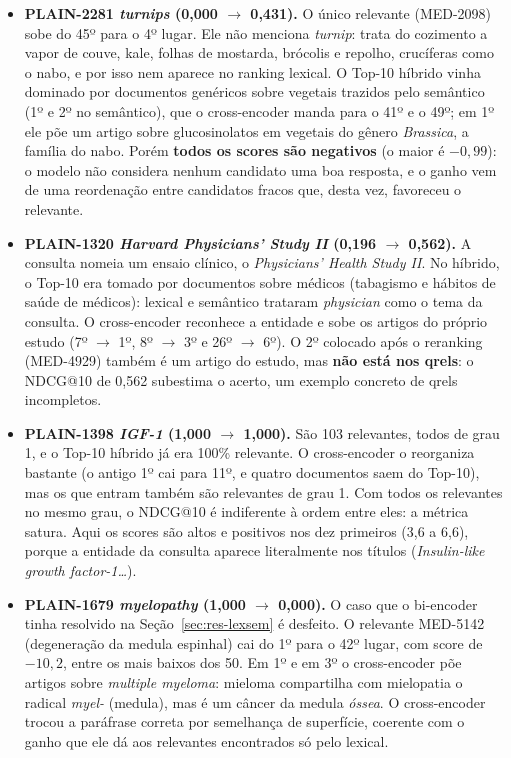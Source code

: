 \documentclass[10pt,a4paper]{article}
\newcommand{\med}[1]{\mbox{MED-#1}}         %
\newcommand{\pq}[1]{\mbox{PLAIN-#1}}        %
\begin{document}
\begin{itemize}
\item \textbf{\pq{2281} \emph{turnips} (0,000 $\to$ 0,431).} O único relevante (\med{2098}) sobe do 45º para o 4º lugar. Ele não menciona \emph{turnip}: trata do cozimento a vapor de couve, kale, folhas de mostarda, brócolis e repolho, crucíferas como o nabo, e por isso nem aparece no ranking lexical. O Top-10 híbrido vinha dominado por documentos genéricos sobre vegetais trazidos pelo semântico (1º e 2º no semântico), que o cross-encoder manda para o 41º e o 49º; em 1º ele põe um artigo sobre glucosinolatos em vegetais do gênero \emph{Brassica}, a família do nabo. Porém \textbf{todos os scores são negativos} (o maior é $-0{,}99$): o modelo não considera nenhum candidato uma boa resposta, e o ganho vem de uma reordenação entre candidatos fracos que, desta vez, favoreceu o relevante.
\item \textbf{\pq{1320} \emph{Harvard Physicians' Study II} (0,196 $\to$ 0,562).} A consulta nomeia um ensaio clínico, o \emph{Physicians' Health Study II}. No híbrido, o Top-10 era tomado por documentos sobre médicos (tabagismo e hábitos de saúde de médicos): lexical e semântico trataram \emph{physician} como o tema da consulta. O cross-encoder reconhece a entidade e sobe os artigos do próprio estudo (7º $\to$ 1º, 8º $\to$ 3º e 26º $\to$ 6º). O 2º colocado após o reranking (\med{4929}) também é um artigo do estudo, mas \textbf{não está nos qrels}: o NDCG@10 de 0,562 subestima o acerto, um exemplo concreto de qrels incompletos.
\item \textbf{\pq{1398} \emph{IGF-1} (1,000 $\to$ 1,000).} São 103 relevantes, todos de grau 1, e o Top-10 híbrido já era 100\% relevante. O cross-encoder o reorganiza bastante (o antigo 1º cai para 11º, e quatro documentos saem do Top-10), mas os que entram também são relevantes de grau 1. Com todos os relevantes no mesmo grau, o NDCG@10 é indiferente à ordem entre eles: a métrica satura. Aqui os scores são altos e positivos nos dez primeiros (3,6 a 6,6), porque a entidade da consulta aparece literalmente nos títulos (\emph{Insulin-like growth factor-1\dots}).
\item \textbf{\pq{1679} \emph{myelopathy} (1,000 $\to$ 0,000).} O caso que o bi-encoder tinha resolvido na Seção~\ref{sec:res-lexsem} é desfeito. O relevante \med{5142} (degeneração da medula espinhal) cai do 1º para o 42º lugar, com score de $-10{,}2$, entre os mais baixos dos 50. Em 1º e em 3º o cross-encoder põe artigos sobre \emph{multiple myeloma}: mieloma compartilha com mielopatia o radical \emph{myel-} (medula), mas é um câncer da medula \emph{óssea}. O cross-encoder trocou a paráfrase correta por semelhança de superfície, coerente com o ganho que ele dá aos relevantes encontrados só pelo lexical.
\end{itemize}
\end{document}
